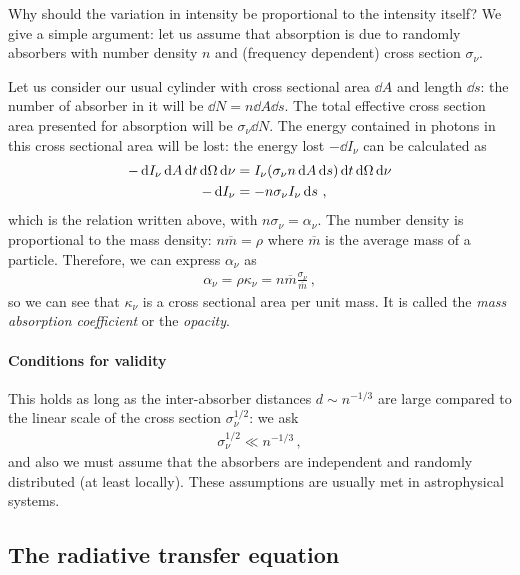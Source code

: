 \documentclass[main.tex]{subfiles}
\begin{document}
Why should the variation in intensity be proportional to the intensity itself? We give a simple argument: 
let us assume that absorption is due to randomly absorbers with number density \(n\) and (frequency dependent) cross section \(\sigma_{\nu }\).  

Let us consider our usual cylinder with cross sectional area \(\dd{A}\) and length \(\dd{s}\): the number of absorber in it will be \(\dd{N} = n \dd{A} \dd{s}\). 
The total effective cross section area presented for absorption will be \(\sigma_{\nu } \dd{N}\). 
The energy contained in photons in this cross sectional area will be lost: the energy lost \(- \dd{I_{\nu }}\) can be calculated as 
%
\begin{align}
- \dd{I_{\nu }} \dd{A} \dd{t} \dd{\Omega} \dd{\nu }
&=  I_{\nu } \qty(\sigma_{\nu } n \dd{A} \dd{s}) \dd{t} \dd{\Omega } \dd{\nu }  \\
- \dd{I_{\nu }} &= - n \sigma_{\nu } I_{\nu } \dd{s}
\,,
\end{align}
%
which is the relation written above, with \(n \sigma_{\nu } = \alpha_{\nu }\). 
The number density is proportional to the mass density: \(n \overline{m} = \rho \) where \(\overline{m} \) is the average mass of a particle. Therefore, we can express \(\alpha_{\nu }\) as 
%
\begin{align}
\alpha_{\nu } = \rho \kappa_{\nu } = n \overline{m} \frac{ \sigma_{\nu }}{\overline{m}}
\,,
\end{align}
%
so we can see that \(\kappa_{\nu }\) is a cross sectional area per unit mass. It is called the \emph{mass absorption coefficient} or the \emph{opacity}. 

\paragraph{Conditions for validity}

This holds as long as the inter-absorber distances \(d \sim n^{-1/3}\) are large compared to the linear scale of the cross section \(\sigma_{\nu }^{1/2}\): we ask 
%
\begin{align}
\sigma_{\nu }^{1/2} \ll n^{-1/3}
\,,
\end{align}
%
and also we must assume that the absorbers are independent and randomly distributed (at least locally).
These assumptions are usually met in astrophysical systems. 

\subsection{The radiative transfer equation}
\end{document}
